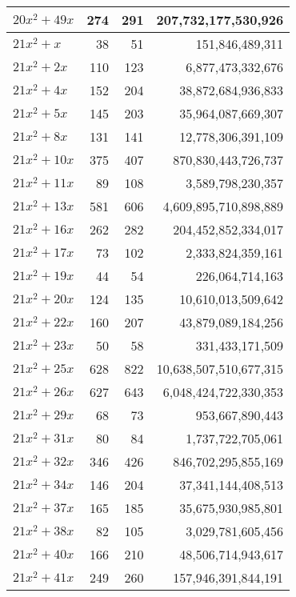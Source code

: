 \documentclass[a4paper]{amsproc}
\theoremstyle{plain}
\theoremstyle{named}
\begin{document}
\begin{longtable}{ | l | r | r | r | }
$20x^2 + 49x$ & 274 & 291 & 207{,}732{,}177{,}530{,}926 \\ \hline
$21x^2 + x$ & 38 & 51 & 151{,}846{,}489{,}311 \\ \hline
$21x^2 + 2x$ & 110 & 123 & 6{,}877{,}473{,}332{,}676 \\ \hline
$21x^2 + 4x$ & 152 & 204 & 38{,}872{,}684{,}936{,}833 \\ \hline
$21x^2 + 5x$ & 145 & 203 & 35{,}964{,}087{,}669{,}307 \\ \hline
$21x^2 + 8x$ & 131 & 141 & 12{,}778{,}306{,}391{,}109 \\ \hline
$21x^2 + 10x$ & 375 & 407 & 870{,}830{,}443{,}726{,}737 \\ \hline
$21x^2 + 11x$ & 89 & 108 & 3{,}589{,}798{,}230{,}357 \\ \hline
$21x^2 + 13x$ & 581 & 606 & 4{,}609{,}895{,}710{,}898{,}889 \\ \hline
$21x^2 + 16x$ & 262 & 282 & 204{,}452{,}852{,}334{,}017 \\ \hline
$21x^2 + 17x$ & 73 & 102 & 2{,}333{,}824{,}359{,}161 \\ \hline
$21x^2 + 19x$ & 44 & 54 & 226{,}064{,}714{,}163 \\ \hline
$21x^2 + 20x$ & 124 & 135 & 10{,}610{,}013{,}509{,}642 \\ \hline
$21x^2 + 22x$ & 160 & 207 & 43{,}879{,}089{,}184{,}256 \\ \hline
$21x^2 + 23x$ & 50 & 58 & 331{,}433{,}171{,}509 \\ \hline
$21x^2 + 25x$ & 628 & 822 & 10{,}638{,}507{,}510{,}677{,}315 \\ \hline
$21x^2 + 26x$ & 627 & 643 & 6{,}048{,}424{,}722{,}330{,}353 \\ \hline
$21x^2 + 29x$ & 68 & 73 & 953{,}667{,}890{,}443 \\ \hline
$21x^2 + 31x$ & 80 & 84 & 1{,}737{,}722{,}705{,}061 \\ \hline
$21x^2 + 32x$ & 346 & 426 & 846{,}702{,}295{,}855{,}169 \\ \hline
$21x^2 + 34x$ & 146 & 204 & 37{,}341{,}144{,}408{,}513 \\ \hline
$21x^2 + 37x$ & 165 & 185 & 35{,}675{,}930{,}985{,}801 \\ \hline
$21x^2 + 38x$ & 82 & 105 & 3{,}029{,}781{,}605{,}456 \\ \hline
$21x^2 + 40x$ & 166 & 210 & 48{,}506{,}714{,}943{,}617 \\ \hline
$21x^2 + 41x$ & 249 & 260 & 157{,}946{,}391{,}844{,}191 \\ \hline

\end{longtable}
\end{document}

